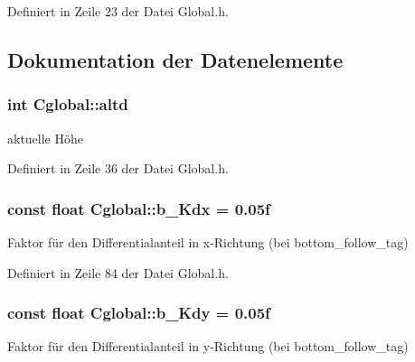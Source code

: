 Definiert in Zeile 23 der Datei Global.h.



\subsection{Dokumentation der Datenelemente}
\hypertarget{class_cglobal_a0e2d4712edf675715bd4bcc554dbcf42}{
\subsubsection[{altd}]{\setlength{\rightskip}{0pt plus 5cm}int {\bf Cglobal::altd}}}
\label{class_cglobal_a0e2d4712edf675715bd4bcc554dbcf42}


aktuelle Höhe 



Definiert in Zeile 36 der Datei Global.h.

\hypertarget{class_cglobal_a78bc2eecbfcfe436e141e9e06b7d6f10}{
\subsubsection[{b\_\-Kdx}]{\setlength{\rightskip}{0pt plus 5cm}const float {\bf Cglobal::b\_\-Kdx} = 0.05f}}
\label{class_cglobal_a78bc2eecbfcfe436e141e9e06b7d6f10}


Faktor für den Differentialanteil in x-\/Richtung (bei bottom\_\-follow\_\-tag) 



Definiert in Zeile 84 der Datei Global.h.

\hypertarget{class_cglobal_a96f46cc71bfa56cf87b9a0e974b8271c}{
\subsubsection[{b\_\-Kdy}]{\setlength{\rightskip}{0pt plus 5cm}const float {\bf Cglobal::b\_\-Kdy} = 0.05f}}
\label{class_cglobal_a96f46cc71bfa56cf87b9a0e974b8271c}


Faktor für den Differentialanteil in y-\/Richtung (bei bottom\_\-follow\_\-tag) 




